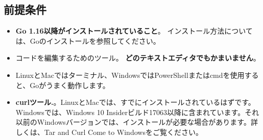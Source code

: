 \subsection{前提条件}

\begin{itemize}
\item
  \textbf{Go 1.16以降がインストールされていること}。
  インストール方法については、Goのインストールを参照してください。
\item
  コードを編集するためのツール。
  \textbf{どのテキストエディタでもかまいません}。
\item
  LinuxとMacではターミナル、WindowsではPowerShellまたはcmdを使用すると、Goがうまく動作します。
\item
  \textbf{curlツール.}。LinuxとMacでは、すでにインストールされているはずです。Windowsでは、Windows
  10
  Insiderビルド17063以降に含まれています。それ以前のWindowsバージョンでは、インストールが必要な場合があります。詳しくは、Tar
  and Curl Come to Windowsをご覧ください。
\end{itemize}
